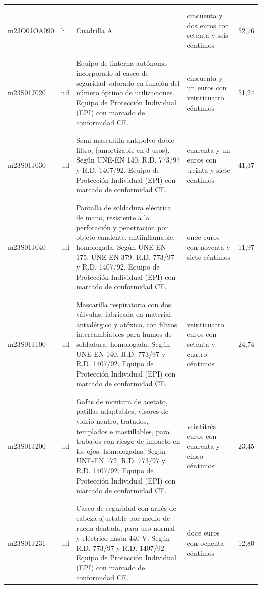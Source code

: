 \documentclass{book}%
\begin{document}
\begin{longtable}{|l|l|p{5cm}|p{3cm}|r|}
&&&&\\%
&&&&\\%
m23O01OA090&h&Cuadrilla A&cincuenta y dos euros con setenta y seis céntimos&52,76\\%
&&&&\\%
&&&&\\%
m23S01J020&ud&Equipo de linterna autónomo incorporado al casco de seguridad valorado en función del número óptimo de utilizaciones. Equipo de Protección Individual (EPI) con marcado de conformidad CE.&cincuenta y un euros con veinticuatro céntimos&51,24\\%
&&&&\\%
&&&&\\%
m23S01J030&ud&Semi mascarilla antipolvo doble filtro, (amortizable en 3 usos). Según UNE{-}EN 140, R.D. 773/97 y R.D. 1407/92. Equipo de Protección Individual (EPI) con marcado de conformidad CE.&cuarenta y un euros con treinta y siete céntimos&41,37\\%
&&&&\\%
&&&&\\%
m23S01J040&ud&Pantalla de soldadura eléctrica de mano, resistente a la perforación y penetración por objeto candente, antiinflamable, homologada. Según UNE{-}EN 175, UNE{-}EN 379, R.D. 773/97 y R.D. 1407/92. Equipo de Protección Individual (EPI) con marcado de conformidad CE.&once euros con noventa y siete céntimos&11,97\\%
&&&&\\%
&&&&\\%
m23S01J100&ud&Mascarilla respiratoria con dos válvulas, fabricada en material antialérgico y atóxico, con filtros intercambiables para humos de soldadura, homologada. Según UNE{-}EN 140, R.D. 773/97 y R.D. 1407/92. Equipo de Protección Individual (EPI) con marcado de conformidad CE.&veinticuatro euros con setenta y cuatro céntimos&24,74\\%
&&&&\\%
&&&&\\%
m23S01J200&ud&Gafas de montura de acetato, patillas adaptables, visores de vidrio neutro, tratados, templados e inastillables, para trabajos con riesgo de impacto en los ojos, homologadas. Según UNE{-}EN 172, R.D. 773/97 y R.D. 1407/92. Equipo de Protección Individual (EPI) con marcado de conformidad CE.&veintitrés euros con cuarenta y cinco céntimos&23,45\\%
&&&&\\%
&&&&\\%
m23S01J231&ud&Casco de seguridad con arnés de cabeza ajustable por medio de rueda dentada, para uso normal y eléctrico hasta 440 V. Según R.D. 773/97 y R.D. 1407/92. Equipo de Protección Individual (EPI) con marcado de conformidad CE.&doce euros con ochenta céntimos&12,80\\%

\end{longtable}
\end{document}
